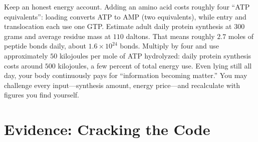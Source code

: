 \begin{qiaoliang}
Keep an honest energy account. Adding an amino acid costs roughly four ``ATP equivalents'': loading converts ATP to AMP (two equivalents), while entry and translocation each use one GTP. Estimate adult daily protein synthesis at $300$ grams and average residue mass at $110$ daltons. That means roughly $2.7$ moles of peptide bonds daily, about $1.6\times 10^{24}$ bonds. Multiply by four and use approximately $50$ kilojoules per mole of ATP hydrolyzed: daily protein synthesis costs around $500$ kilojoules, a few percent of total energy use. Even lying still all day, your body continuously pays for ``information becoming matter.'' You may challenge every input---synthesis amount, energy price---and recalculate with figures you find yourself.
\end{qiaoliang}

\section{Evidence: Cracking the Code}

